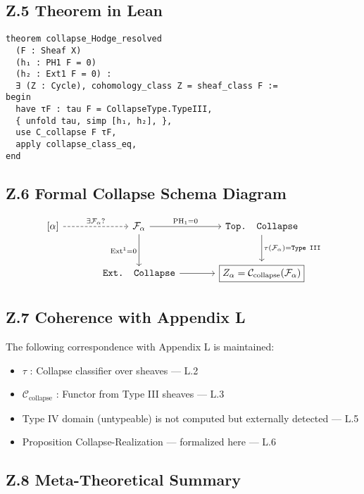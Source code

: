 \documentclass[11pt]{article}
\DeclareMathOperator{\Ext}{Ext}
\DeclareMathOperator{\PH}{PH}
\begin{document}
\subsection*{Z.5 Theorem in Lean}

\begin{lstlisting}[language=Lean, caption={Collapse Realization Theorem in Lean}]
theorem collapse_Hodge_resolved
  (F : Sheaf X)
  (h₁ : PH1 F = 0)
  (h₂ : Ext1 F = 0) :
  ∃ (Z : Cycle), cohomology_class Z = sheaf_class F :=
begin
  have τF : tau F = CollapseType.TypeIII,
  { unfold tau, simp [h₁, h₂], },
  use C_collapse F τF,
  apply collapse_class_eq,
end
\end{lstlisting}

\subsection*{Z.6 Formal Collapse Schema Diagram}

\[
\begin{tikzcd}[row sep=large, column sep=large]
[\alpha] \arrow[r, dashed, "\exists \mathcal{F}_\alpha?"]
& \mathcal{F}_\alpha \arrow[r, "\PH_1 = 0"] \arrow[d, swap, "\Ext^1 = 0"]
& \texttt{Top. Collapse} \arrow[d, "\tau(\mathcal{F}_\alpha) = \texttt{Type III}"] \\
& \texttt{Ext. Collapse} \arrow[r]
& \boxed{Z_\alpha = \mathcal{C}_{\text{collapse}}(\mathcal{F}_\alpha)}
\end{tikzcd}
\]

\subsection*{Z.7 Coherence with Appendix L}

The following correspondence with Appendix L is maintained:

\begin{itemize}
  \item $\tau$ : Collapse classifier over sheaves — L.2
  \item $\mathcal{C}_{\text{collapse}}$ : Functor from Type III sheaves — L.3
  \item Type IV domain (untypeable) is not computed but externally detected — L.5
  \item Proposition Collapse-Realization — formalized here — L.6
\end{itemize}

\subsection*{Z.8 Meta-Theoretical Summary}
\end{document}

